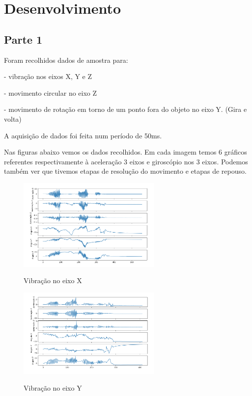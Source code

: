 \section{Desenvolvimento}

\subsection*{Parte 1}

Foram recolhidos dados de amostra para:

- vibração nos eixos X, Y e Z

- movimento circular no eixo Z

- movimento de rotação em torno de um ponto fora do objeto no eixo Y. (Gira e volta)

A aquisição de dados foi feita num período de 50ms.

Nas figuras abaixo vemos os dados recolhidos. Em cada imagem temos 6 gráficos referentes respectivamente à aceleração 3 eixos e giroscópio nos 3 eixos.
Podemos também ver que tivemos etapas de resolução do movimento e etapas de repouso.


\begin{figure}[H]
    \center
    \includegraphics[width=7cm]{images/VibracaoX.png}
    \label{img6}
    \caption{Vibração no eixo X}
\end{figure}

\begin{figure}[H]
    \center
    \includegraphics[width=7cm]{images/VibracaoY.png}
    \label{img2}
    \caption{Vibração no eixo Y}
\end{figure}

